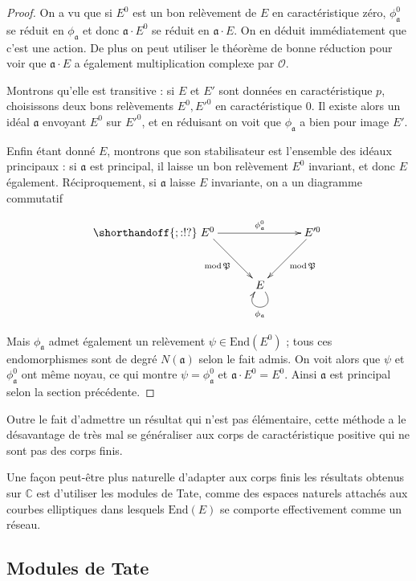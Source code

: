 \documentclass[11pt,a4paper]{article}
\newcommand{\C}{\mathbb{C}}
\renewcommand{\O}{\mathcal{O}}
\newcommand{\End}{\mathrm{End}}
\renewcommand{\frak}{\mathfrak}
\theoremstyle{definition}
\begin{document}
\begin{proof}

On a vu que si $E^0$ est un bon relèvement de $E$ en caractéristique zéro, $\phi_{\frak a}^0$ se réduit en $\phi_{\frak a}$ et donc $\frak a\cdot E^0$ se réduit en $\frak a\cdot E$. On en déduit immédiatement que c'est une action. De plus on peut utiliser le théorème de bonne réduction pour voir que $\frak a\cdot E$ a également multiplication complexe par $\O$.

Montrons qu'elle est transitive : si $E$ et $E'$ sont données en caractéristique $p$, choisissons deux bons relèvements $E^0, E'^0$ en caractéristique 0. Il existe alors un idéal $\frak a$ envoyant $E^0$ sur $E'^0$, et en réduisant on voit que $\phi_{\frak a}$ a bien pour image $E'$.

Enfin étant donné $E$, montrons que son stabilisateur est l'ensemble des idéaux principaux : si $\frak a$ est principal, il laisse un bon relèvement $E^0$ invariant, et donc $E$ également. Réciproquement, si $\frak a$ laisse $E$ invariante, on a un diagramme commutatif

$$
\shorthandoff{;:!?}
\xymatrix @!=8mm {
E^0 \ar[rr]^{\phi_{\frak a}^0} \ar[rd]_{\mathrm{mod}\,\frak P} & & E'^0 \ar[ld]^{\mathrm{mod}\,\frak P} \\
 & E \ar@(dr,dl)^{\phi_{\frak a}} & 
}
$$

Mais $\phi_{\frak a}$ admet également un relèvement $\psi\in \End(E^0)$ ; tous ces endomorphismes sont de degré $N(\frak a)$ selon le fait admis. On voit alors que $\psi$ et $\phi_{\frak a}^0$ ont même noyau, ce qui montre $\psi=\phi_{\frak a}^0$ et $\frak a\cdot E^0 = E^0$. Ainsi $\frak a$ est principal selon la section précédente.
\end{proof}


Outre le fait d'admettre un résultat qui n'est pas élémentaire, cette méthode a le désavantage de très mal se généraliser aux corps de caractéristique positive qui ne sont pas des corps finis.

Une façon peut-être plus naturelle d'adapter aux corps finis les résultats obtenus sur $\C$ est d'utiliser les modules de Tate, comme des espaces naturels attachés aux courbes elliptiques dans lesquels $\End(E)$ se comporte effectivement comme un réseau.




\newpage

\subsection{Modules de Tate}
\end{document}

